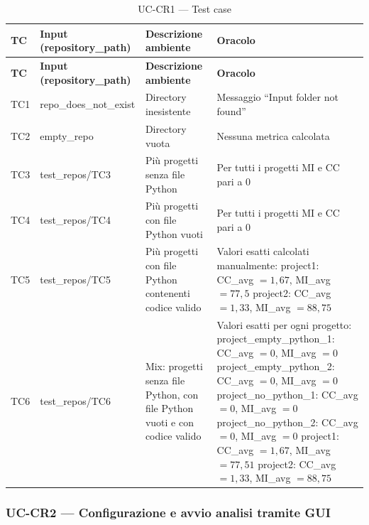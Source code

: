 \documentclass[11pt,a4paper]{article}
\makeatletter
\newif\ifmark@prevlower
\def\mark@casebreak#1{%
  \ifcat\noexpand#1\relax
    \mark@prevlowerfalse
  \else
    \ifnum`#1=\uccode`#1\relax
      \ifmark@prevlower\allowbreak\fi
      \mark@prevlowerfalse
    \else
      \ifnum`#1=\lccode`#1\relax
        \mark@prevlowertrue
      \else
        \mark@prevlowerfalse
      \fi
    \fi
  \fi}
\def\mark@brk#1{%
  \ifx#1\mark@stop
    \let\mark@next\relax
  \else
    \mark@casebreak{#1}%
    #1%
    \ifx#1.\allowbreak\else
      \ifx#1\_\allowbreak\else
        \ifx#1/\allowbreak\else
          \ifx#1(\allowbreak\fi
        \fi
      \fi
    \fi
    \let\mark@next\mark@brk
  \fi
  \mark@next}
\def\mark@stop{\mark@stop}
\DeclareRobustCommand{\mark@code}[1]{%
  \ifmmode
    \text{\ttfamily\small\mark@prevlowerfalse\mark@brk#1\mark@stop}%
  \else
    {\ttfamily\small\mark@prevlowerfalse\mark@brk#1\mark@stop}%
  \fi}
\DeclareRobustCommand{\code}[1]{\mark@code{#1}}
\DeclareRobustCommand{\file}[1]{\mark@code{#1}}
\DeclareRobustCommand{\flag}[1]{\mark@code{#1}}
\def\mark@code#1{#1}%
\def\code#1{#1}%
\def\file#1{#1}%
\def\flag#1{#1}%
\newcommand{\thead}[1]{\textbf{#1}}
\makeatother
\begin{document}
\begin{longtable}{@{}L{1.2cm} L{3.0cm} L{3.8cm} L{6.5cm}@{}}
  \caption{UC-CR1 --- Test case}\label{tab:st-cr1-tc}\\
  \toprule
  \thead{TC} & \thead{Input (\flag{repository\_path})} &
  \thead{Descrizione ambiente} & \thead{Oracolo}\\
  \midrule
  \endfirsthead
  \toprule
  \thead{TC} & \thead{Input (\flag{repository\_path})} &
  \thead{Descrizione ambiente} & \thead{Oracolo}\\
  \midrule
  \endhead
  \bottomrule
  \endfoot
  TC1 & \file{repo\_does\_not\_exist} & Directory inesistente &
    Messaggio ``Input folder not found''\\
  TC2 & \file{empty\_repo} & Directory vuota & Nessuna metrica calcolata\\
  TC3 & \file{test\_repos/TC3} & Pi\`u progetti senza file Python &
    Per tutti i progetti MI e CC pari a 0\\
  TC4 & \file{test\_repos/TC4} & Pi\`u progetti con file Python vuoti &
    Per tutti i progetti MI e CC pari a 0\\
  TC5 & \file{test\_repos/TC5} & Pi\`u progetti con file Python contenenti
    codice valido &
    Valori esatti calcolati manualmente:\newline
    \code{project1}: CC\_avg $=1{,}67$, MI\_avg $=77{,}5$\newline
    \code{project2}: CC\_avg $=1{,}33$, MI\_avg $=88{,}75$\\
  TC6 & \file{test\_repos/TC6} & Mix: progetti senza file Python, con file
    Python vuoti e con codice valido &
    Valori esatti per ogni progetto:\newline
    \code{project\_empty\_python\_1}: CC\_avg $=0$, MI\_avg $=0$\newline
    \code{project\_empty\_python\_2}: CC\_avg $=0$, MI\_avg $=0$\newline
    \code{project\_no\_python\_1}: CC\_avg $=0$, MI\_avg $=0$\newline
    \code{project\_no\_python\_2}: CC\_avg $=0$, MI\_avg $=0$\newline
    \code{project1}: CC\_avg $=1{,}67$, MI\_avg $=77{,}51$\newline
    \code{project2}: CC\_avg $=1{,}33$, MI\_avg $=88{,}75$\\
\end{longtable}

\subsubsection{UC-CR2 --- Configurazione e avvio analisi tramite GUI}
\label{sec:st-cr2}
\end{document}
